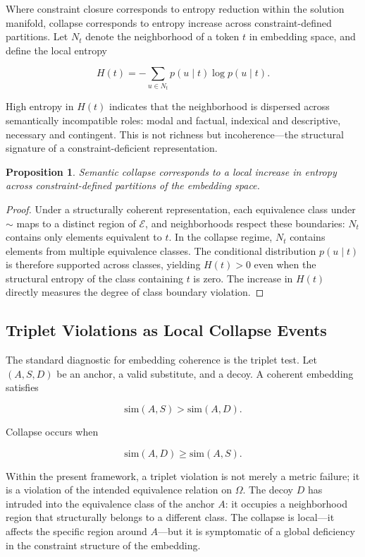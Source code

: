 \documentclass[11pt, twoside]{article}
\theoremstyle{plain}
\newtheorem{proposition}[theorem]{Proposition}
\theoremstyle{definition}
\theoremstyle{remark}
\begin{document}
Where constraint closure corresponds to entropy reduction within the solution manifold, collapse corresponds to entropy increase across constraint-defined partitions. Let $N_t$ denote the neighborhood of a token $t$ in embedding space, and define the local entropy

\[
H(t) = -\sum_{u \in N_t} p(u \mid t) \log p(u \mid t).
\]

High entropy in $H(t)$ indicates that the neighborhood is dispersed across semantically incompatible roles: modal and factual, indexical and descriptive, necessary and contingent. This is not richness but incoherence---the structural signature of a constraint-deficient representation.

\begin{proposition}
Semantic collapse corresponds to a local increase in entropy across constraint-defined partitions of the embedding space.
\end{proposition}

\begin{proof}
Under a structurally coherent representation, each equivalence class under $\sim$ maps to a distinct region of $\mathcal{E}$, and neighborhoods respect these boundaries: $N_t$ contains only elements equivalent to $t$. In the collapse regime, $N_t$ contains elements from multiple equivalence classes. The conditional distribution $p(u \mid t)$ is therefore supported across classes, yielding $H(t) > 0$ even when the structural entropy of the class containing $t$ is zero. The increase in $H(t)$ directly measures the degree of class boundary violation.
\end{proof}

\subsection{Triplet Violations as Local Collapse Events}

The standard diagnostic for embedding coherence is the triplet test. Let $(A, S, D)$ be an anchor, a valid substitute, and a decoy. A coherent embedding satisfies

\[
\mathrm{sim}(A, S) > \mathrm{sim}(A, D).
\]

Collapse occurs when

\[
\mathrm{sim}(A, D) \geq \mathrm{sim}(A, S).
\]

Within the present framework, a triplet violation is not merely a metric failure; it is a violation of the intended equivalence relation on $\Omega$. The decoy $D$ has intruded into the equivalence class of the anchor $A$: it occupies a neighborhood region that structurally belongs to a different class. The collapse is local---it affects the specific region around $A$---but it is symptomatic of a global deficiency in the constraint structure of the embedding.
\end{document}
